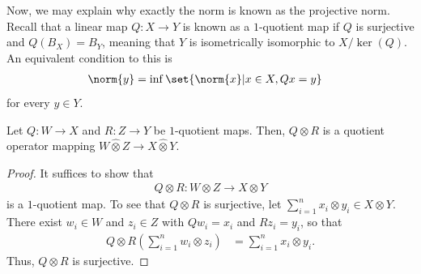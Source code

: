\documentclass[10pt]{mypackage}
\begin{document}
Now, we may explain why exactly the norm is known as the projective norm. Recall that a linear map $Q\colon X\rightarrow Y$ is known as a $1$-quotient map if $Q$ is surjective and $Q\left( B_X \right) = B_Y$, meaning that $Y$ is isometrically isomorphic to $X/\ker(Q)$. An equivalent condition to this is 
\begin{align*}
  \norm{y} &= \inf\set{\norm{x} | x\in X,Qx = y}
\end{align*}
for every $y\in Y$.
\begin{proposition}
  Let $Q\colon W\rightarrow X$ and $R\colon Z\rightarrow Y$ be $1$-quotient maps. Then, $Q\otimes R$ is a quotient operator mapping $W\hat\otimes Z\rightarrow X\hat\otimes Y$.
\end{proposition}
\begin{proof}
  It suffices to show that
  \begin{align*}
    Q\otimes R\colon W\otimes Z \rightarrow X\otimes Y
  \end{align*}
  is a $1$-quotient map. To see that $Q\otimes R$ is surjective, let $\sum_{i=1}^{n}x_i\otimes y_i\in X\otimes Y$. There exist $w_i\in W$ and $z_i\in Z$ with $Qw_i = x_i$ and $Rz_i = y_i$, so that
  \begin{align*}
    Q\otimes R \left( \sum_{i=1}^{n}w_i\otimes z_i \right) &= \sum_{i=1}^{n}x_i\otimes y_i.
  \end{align*}
  Thus, $Q\otimes R$ is surjective.


\end{proof}
\end{document}
